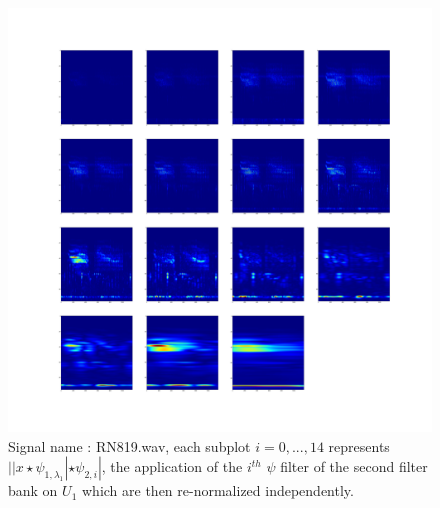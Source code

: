 \documentclass[a4paper]{report}
\begin{document}
\begin{figure}[H]
\begin{center}
\includegraphics[scale=0.1]{RN819_1.png}\caption{Signal name : RN819.wav, each subplot $i=0,...,14$ represents $||x \star \psi_{1,\lambda_1}|\star \psi_{2,i}|$, the application of the $i^{th}$ $\psi$ filter of the second filter bank on $U_1$ which are then re-normalized independently.}
\end{center}
\end{figure}
\end{document}
